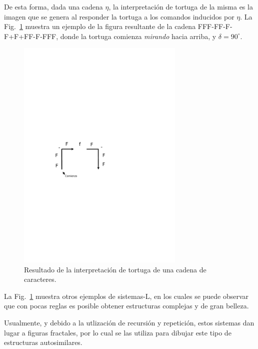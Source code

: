 De esta forma, dada una cadena $\eta$, la interpretación de tortuga de la misma es la imagen que se genera al responder la tortuga a los comandos inducidos por $\eta$.
La Fig.~\ref{fg:tortuga} muestra un ejemplo de la figura resultante de la cadena FFF-FF-F-F+F+FF-F-FFF, donde la tortuga comienza {\em mirando} hacia arriba, y $\delta = 90^{\circ}$.

\begin{figure}
\center
\includegraphics[width=8cm]{figures/tortuga}
\caption{Resultado de la interpretación de tortuga de una cadena de caracteres.}
\label{fg:tortuga}
\end{figure}

La Fig.~\ref{fg:tortuga} muestra otros ejemplos de sistemas-L, en los cuales se puede observar que con pocas reglas es posible obtener estructuras complejas y de gran belleza.

Usualmente, y debido a la utlización de recursión y repetición, estos sistemas dan lugar a figuras fractales, por lo cual se las utiliza para dibujar este tipo de estructuras autosimilares.

